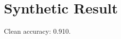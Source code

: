 \documentclass{article}
\begin{document}
\section{Synthetic Result}
Clean accuracy: 0.910.
\end{document}
